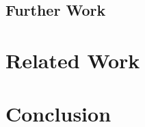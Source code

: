 \documentclass[11pt,journal,compsoc]{IEEEtran}
\begin{document}
\subsection{Further Work}

\section{Related Work}

\section{Conclusion}






%
\end{document}
